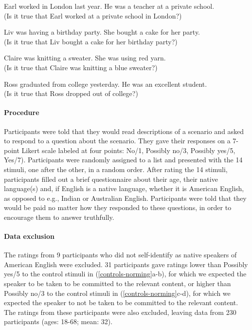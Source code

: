 \documentclass[11pt,fleqn]{article}
\newcommand{\6}{\mbox{$[\hspace*{-.6mm}[$}}
\newcommand{\9}{\mbox{$]\hspace*{-.6mm}]$}}
\begin{document}
\begin{exe}
\ex\label{controls-norming}
\begin{xlist}
\ex Earl worked in London last year. He was a teacher at a private school. 
\\ (Is it true that Earl worked at a private school in London?)

\ex Liv was having a birthday party. She bought a cake for her party.
\\ (Is it true that Liv bought a cake for her birthday party?)

\ex Claire was knitting a sweater. She was using red yarn. 
\\ (Is it true that Claire was knitting a blue sweater?)

\ex Ross graduated from college yesterday. He was an excellent student. 
\\ (Is it true that Ross dropped out of college?)

\end{xlist}
\end{exe}

\paragraph{Procedure}

Participants were told that they would read descriptions of a scenario and asked to respond to a question about the scenario. They gave their responses on a 7-point Likert scale labeled at four points: No/1, Possibly no/3, Possibly yes/5,
Yes/7). Participants were randomly assigned to a list and presented with the 14 stimuli, one after the other, in a random order. After rating the 14 stimuli, participants filled out a brief questionnaire about their age, their native language(s) and, if English is a native language, whether it is American English, as opposed to e.g., Indian or Australian English. Participants were told that they would be paid no matter how they
responded to these questions, in order to encourage them to answer
truthfully.


\paragraph{Data exclusion} 

The ratings from 9 participants who did not self-identify as native speakers of American English were excluded. 31 participants gave ratings lower than Possibly yes/5 to the control stimuli in (\ref{controls-norming}a-b), for which we expected the speaker to be taken to be committed to the relevant content, or higher than Possibly no/3 to the control stimuli in (\ref{controls-norming}c-d), for which we expected the speaker to not be taken to be committed to the relevant content. The ratings from these participants were also excluded, leaving data from 230 participants (ages: 18-68; mean: 32). 
\end{document}
